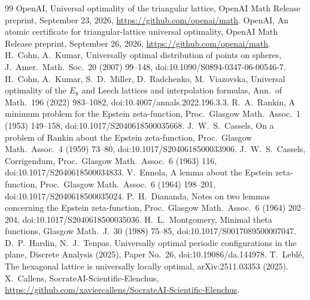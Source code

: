 \documentclass[11pt]{article}
\begin{document}
\begin{thebibliography}{99}
 OpenAI, Universal optimality of the triangular lattice, OpenAI Math Release preprint, September 23, 2026,
\url{https://github.com/openai/math}.
 OpenAI, An atomic certificate for triangular-lattice universal optimality, OpenAI Math Release preprint, September 26, 2026, \url{https://github.com/openai/math}.
 H.~Cohn, A.~Kumar, Universally optimal distribution of points on spheres, J.\ Amer.\ Math.\ Soc.\ 20 (2007) 99--148,
doi:10.1090/S0894-0347-06-00546-7.
 H.~Cohn, A.~Kumar, S.~D.~Miller, D.~Radchenko, M.~Viazovska, Universal optimality of the $E_8$ and Leech lattices and
interpolation formulas, Ann.\ of Math.\ 196 (2022) 983--1082, doi:10.4007/annals.2022.196.3.3.
 R.~A.~Rankin, A minimum problem for the Epstein zeta-function, Proc.\ Glasgow Math.\ Assoc.\ 1 (1953) 149--158, doi:10.1017/S2040618500035668.
 J.~W.~S.~Cassels, On a problem of Rankin about the Epstein zeta-function, Proc.\ Glasgow Math.\ Assoc.\ 4 (1959) 73--80, doi:10.1017/S2040618500033906.
 J.~W.~S.~Cassels, Corrigendum, Proc.\ Glasgow Math.\ Assoc.\ 6 (1963) 116, doi:10.1017/S2040618500034833.
 V.~Ennola, A lemma about the Epstein zeta-function, Proc.\ Glasgow Math.\ Assoc.\ 6 (1964) 198--201, doi:10.1017/S2040618500035024.
 P.~H.~Diananda, Notes on two lemmas concerning the Epstein zeta-function, Proc.\ Glasgow Math.\ Assoc.\ 6 (1964) 202--204, doi:10.1017/S2040618500035036.
 H.~L.~Montgomery, Minimal theta functions, Glasgow Math.\ J.\ 30 (1988) 75--85, doi:10.1017/S0017089500007047.
 D.~P.~Hardin, N.~J.~Tenpas, Universally optimal periodic configurations in the plane, Discrete Analysis (2025), Paper No.~26,
doi:10.19086/da.144978.
 T.~Lebl\'e, The hexagonal lattice is universally locally optimal, arXiv:2511.03353 (2025).
 X.~Callens, SocrateAI-Scientific-Elenchus, \url{https://github.com/xaviercallens/SocrateAI-Scientific-Elenchus}.
\end{thebibliography}
\end{document}
